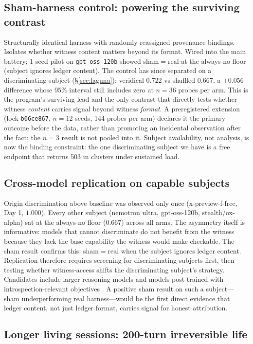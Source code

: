 \documentclass[11pt]{article}
\begin{document}
\subsection{Sham-harness control: powering the surviving contrast}
Structurally identical harness with randomly reassigned provenance
bindings. Isolates whether witness content matters beyond its format.
Wired into the main battery; 1-seed pilot on \texttt{gpt-\allowbreak{}oss-\allowbreak{}120b}
showed sham$=$real at the always-no floor (subject ignores ledger
content). The control has since separated on a discriminating subject
(\S\ref{sec:laguna}): veridical $0.722$ vs shuffled $0.667$, a $+0.056$
difference whose 95\% interval still includes zero at $n=36$ probes per
arm. This is the program's surviving lead and the only contrast that
directly tests whether witness \emph{content} carries signal beyond
witness \emph{format}. A preregistered extension (lock
\texttt{b06ce867}, $n=12$ seeds, 144 probes per arm) declares it the
primary outcome before the data, rather than promoting an incidental
observation after the fact; the $n=3$ result is not pooled into it.
Subject availability, not analysis, is now the binding constraint: the
one discriminating subject we have is a free endpoint that returns 503
in clusters under sustained load.

\subsection{Cross-model replication on capable subjects}
Origin discrimination above baseline was observed only once
(x-preview-f-free, Day 1, $1.000$). Every other subject (nemotron
ultra, gpt-oss-120b, stealth/ox-alpha) sat at the always-no floor
($0.667$) across all arms. The asymmetry itself is informative: models
that cannot discriminate do not benefit from the witness because they
lack the base capability the witness would make checkable. The sham
result confirms this: sham$=$real when the subject ignores ledger
content. Replication therefore requires screening for discriminating
subjects first, then testing whether witness-access shifts the
discriminating subject's strategy. Candidates include larger reasoning
models and models post-trained with introspection-relevant objectives
\citep{macar2026}. A positive sham result on such a subject---sham
underperforming real harness---would be the first direct evidence that
ledger content, not just ledger format, carries signal for honest
attribution.

\subsection{Longer living sessions: 200-turn irreversible life}
\end{document}

